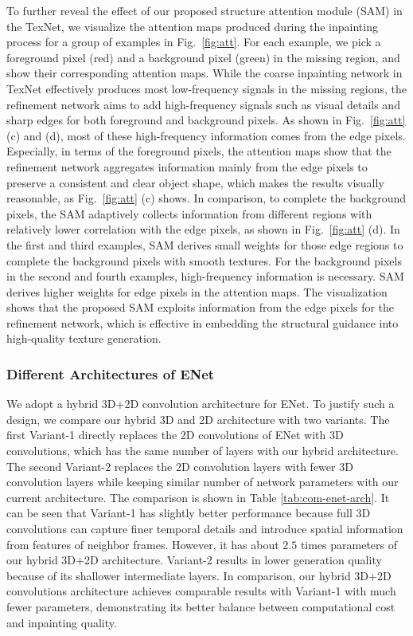 To further reveal the effect of our proposed structure attention module (SAM) in the TexNet, we visualize the attention maps produced during the inpainting process for a group of examples in Fig.~\ref{fig:att}.
For each example, we pick a foreground pixel (red) and a background pixel (green) in the missing region, and show their corresponding attention maps.
%
While the coarse inpainting network in TexNet effectively produces most low-frequency signals in the missing regions, the refinement network aims to add high-frequency signals such as visual details and sharp edges for both foreground and background pixels.
%
As shown in Fig.~\ref{fig:att} (c) and (d), most of these high-frequency information comes from the edge pixels.
%
Especially, in terms of the foreground pixels, the attention maps show that the refinement network aggregates information mainly from the edge pixels to preserve a consistent and clear object shape, which makes the results visually reasonable, as Fig.~\ref{fig:att} (c) shows.
In comparison, to complete the background pixels, the SAM adaptively collects information from different regions with relatively lower correlation with the edge pixels, as shown in Fig.~\ref{fig:att} (d).
%
In the first and third examples, SAM derives small weights for those edge regions to complete the background pixels with smooth textures. 
For the background pixels in the second and fourth examples, high-frequency information is necessary. SAM derives higher weights for edge pixels in the attention maps.  
%
The visualization shows that the proposed SAM exploits information from the edge pixels for the refinement network, which is effective in embedding the structural guidance into high-quality texture generation.



{\color{blue}
\subsubsection{Different Architectures of ENet}
We adopt a hybrid 3D+2D convolution architecture for ENet. To justify such a design, we compare our hybrid 3D and 2D architecture with two variants. The first Variant-1 directly replaces the 2D convolutions of ENet with 3D convolutions, which has the same number of layers with our hybrid architecture. The second Variant-2 replaces the 2D convolution layers with fewer 3D convolution layers while keeping similar number of network parameters with our current architecture. The comparison is shown in Table \ref{tab:com-enet-arch}. It can be seen that Variant-1 has slightly better performance because full 3D convolutions can capture finer temporal details and introduce spatial information from features of neighbor frames. However, it has about $2.5$ times parameters of our hybrid 3D+2D architecture. Variant-2 results in lower generation quality because of its shallower intermediate layers. 
In comparison, our hybrid 3D+2D convolutions architecture achieves comparable results with Variant-1 with much fewer parameters, demonstrating its better balance between computational cost and inpainting quality.

}


